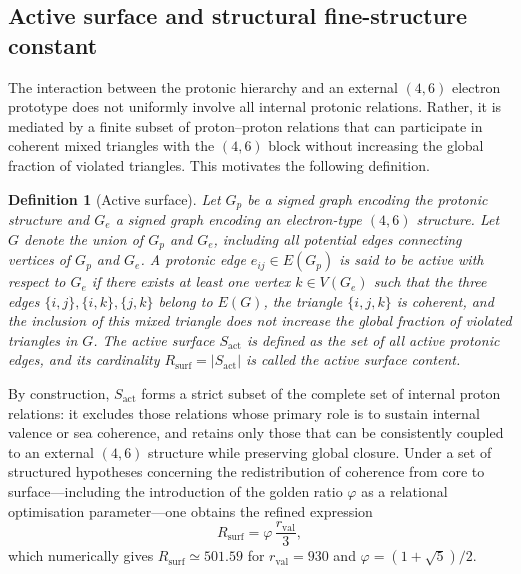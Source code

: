\documentclass[11pt,a4paper]{article}
\newtheorem{definition}{Definition}
\begin{document}
\subsection{Active surface and structural fine-structure constant}

The interaction between the protonic hierarchy and an external $(4,6)$ electron prototype does not uniformly involve all internal protonic relations. Rather, it is mediated by a finite subset of proton--proton relations that can participate in coherent mixed triangles with the $(4,6)$ block without increasing the global fraction of violated triangles.\cite{Laubscher2026DerivationAlpha} This motivates the following definition.

\begin{definition}[Active surface]
Let $G_p$ be a signed graph encoding the protonic structure and $G_e$ a signed graph encoding an electron-type $(4,6)$ structure. Let $G$ denote the union of $G_p$ and $G_e$, including all potential edges connecting vertices of $G_p$ and $G_e$. A protonic edge $e_{ij}\in E(G_p)$ is said to be \emph{active} with respect to $G_e$ if there exists at least one vertex $k\in V(G_e)$ such that the three edges $\{i,j\},\{i,k\},\{j,k\}$ belong to $E(G)$, the triangle $\{i,j,k\}$ is coherent, and the inclusion of this mixed triangle does not increase the global fraction of violated triangles in $G$. The \emph{active surface} $S_{\mathrm{act}}$ is defined as the set of all active protonic edges, and its cardinality $R_{\mathrm{surf}} = |S_{\mathrm{act}}|$ is called the active surface content.
\end{definition}

By construction, $S_{\mathrm{act}}$ forms a strict subset of the complete set of internal proton relations: it excludes those relations whose primary role is to sustain internal valence or sea coherence, and retains only those that can be consistently coupled to an external $(4,6)$ structure while preserving global closure. Under a set of structured hypotheses concerning the redistribution of coherence from core to surface---including the introduction of the golden ratio $\varphi$ as a relational optimisation parameter—one obtains the refined expression
\begin{equation}
R_{\mathrm{surf}} = \varphi\,\frac{r_{\mathrm{val}}}{3},
\end{equation}
which numerically gives $R_{\mathrm{surf}} \simeq 501.59$ for $r_{\mathrm{val}}=930$ and $\varphi = (1+\sqrt{5})/2$.\cite{Laubscher2026DerivationAlpha}
\end{document}
